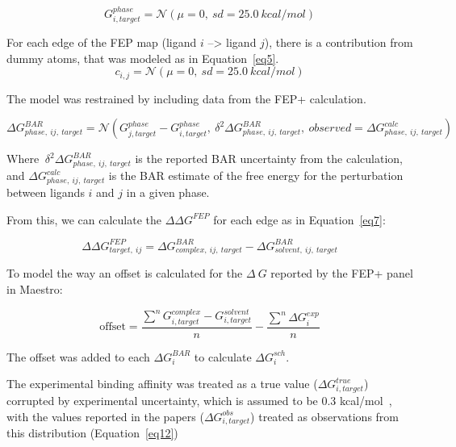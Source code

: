 \documentclass[9pt,lineno]{elife-modified} %
\begin{document}
 \begin{equation}\label{eq4}
G^{phase}_{i,target} = \mathcal{N}(\mu=0,~sd=25.0~kcal/mol)
 \end{equation}
 
 For each edge of the FEP map (ligand $i$ --> ligand $j$), there is a contribution from dummy atoms, that was modeled as in Equation~\ref{eq5}.  
  \begin{equation}\label{eq5}
c_{i,j} = \mathcal{N}(\mu=0,~sd=25.0~kcal/mol)
 \end{equation}
 
 The model was restrained by including data from the FEP+ calculation. 
 
 \begin{equation}\label{eq6}
 \Delta G^{BAR}_{phase, ~ij, ~target} = \mathcal{N}(G^{phase}_{j, target} - G^{phase}_{i, target},~\delta^2\Delta G^{BAR}_{phase, ~ij, ~target}, ~observed = \Delta G^{calc}_{phase,~ij,~target})
 \end{equation}
 
 Where $~\delta^2\Delta G^{BAR}_{phase, ~ij, ~target}$ is the reported BAR uncertainty from the calculation, and $\Delta G^{calc}_{phase,~ij,~target}$ is the BAR estimate of the free energy for the perturbation between ligands $i$ and $j$ in a given phase. 
 
 From this, we can calculate the $\Delta \Delta G^{FEP}$ for each edge as in Equation~\ref{eq7}:
 
 \begin{equation}\label{eq7}
 \Delta\Delta G^{FEP}_{target,~ij} = \Delta G^{BAR}_{complex,~ij,~target} - \Delta G^{BAR}_{solvent,~ij,~target}
 \end{equation}
 
 To model the way an offset is calculated for the $\Delta~G$ reported by the FEP+ panel in Maestro: 
 
\begin{equation}\label{eq8}
\text{offset} =  \frac{\sum^n G^{complex}_{i,target} - G^{solvent}_{i,target}}{n} - \frac{\sum^n \Delta G^{exp}_{i}}{n}
\end{equation}

The offset was added to each $\Delta G^{BAR}_{i}$ to calculate $\Delta G^{sch}_{i}$. 

The experimental binding affinity was treated as a true value ($\Delta G^{true}_{i,target}$) corrupted by experimental uncertainty, which is assumed to be 0.3 kcal/mol~\citep{BROWN2009420}, with the values reported in the papers ($\Delta G^{obs}_{i,target}$) treated as observations from this distribution (Equation~\ref{eq12}) 
\end{document}
